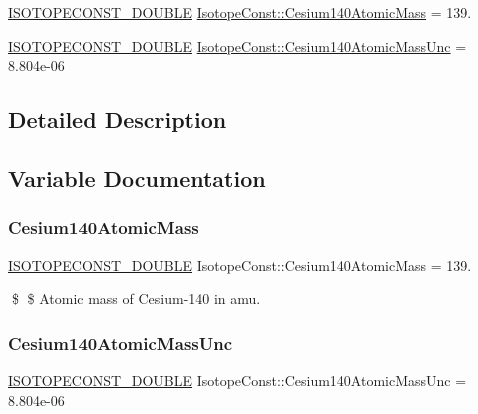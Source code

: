 \begin{DoxyCompactItemize}
\item 
\mbox{\hyperlink{group___isotope_const-_macros_ga8f45a7272ce02c0b4c65c44636ed719a}{I\+S\+O\+T\+O\+P\+E\+C\+O\+N\+S\+T\+\_\+\+D\+O\+U\+B\+LE}} \mbox{\hyperlink{group___isotope_const-_cesium-_cs140_ga6cf3ad567ea104624a73691f29470506}{Isotope\+Const\+::\+Cesium140\+Atomic\+Mass}} = 139.
\item 
\mbox{\hyperlink{group___isotope_const-_macros_ga8f45a7272ce02c0b4c65c44636ed719a}{I\+S\+O\+T\+O\+P\+E\+C\+O\+N\+S\+T\+\_\+\+D\+O\+U\+B\+LE}} \mbox{\hyperlink{group___isotope_const-_cesium-_cs140_ga5fe39649b23499dc7c92bacdf87084c1}{Isotope\+Const\+::\+Cesium140\+Atomic\+Mass\+Unc}} = 8.\+804e-\/06
\end{DoxyCompactItemize}


\subsection{Detailed Description}


\subsection{Variable Documentation}
\mbox{\label{group___isotope_const-_cesium-_cs140_ga6cf3ad567ea104624a73691f29470506}} 
\subsubsection{\texorpdfstring{Cesium140\+Atomic\+Mass}{Cesium140AtomicMass}}
{\footnotesize\ttfamily \mbox{\hyperlink{group___isotope_const-_macros_ga8f45a7272ce02c0b4c65c44636ed719a}{I\+S\+O\+T\+O\+P\+E\+C\+O\+N\+S\+T\+\_\+\+D\+O\+U\+B\+LE}} Isotope\+Const\+::\+Cesium140\+Atomic\+Mass = 139.}

\$ \$ Atomic mass of Cesium-\/140 in amu. \mbox{\label{group___isotope_const-_cesium-_cs140_ga5fe39649b23499dc7c92bacdf87084c1}} 
\subsubsection{\texorpdfstring{Cesium140\+Atomic\+Mass\+Unc}{Cesium140AtomicMassUnc}}
{\footnotesize\ttfamily \mbox{\hyperlink{group___isotope_const-_macros_ga8f45a7272ce02c0b4c65c44636ed719a}{I\+S\+O\+T\+O\+P\+E\+C\+O\+N\+S\+T\+\_\+\+D\+O\+U\+B\+LE}} Isotope\+Const\+::\+Cesium140\+Atomic\+Mass\+Unc = 8.\+804e-\/06}

